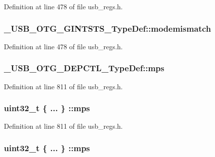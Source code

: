 Definition at line 478 of file usb\-\_\-regs.\-h.

\hypertarget{group___u_s_b___o_t_g___d_r_i_v_e_r_gab4fbf47de9e36e092edfc6ee201616d2}{
\subsubsection[{modemismatch}]{ \-\_\-\-U\-S\-B\-\_\-\-O\-T\-G\-\_\-\-G\-I\-N\-T\-S\-T\-S\-\_\-\-Type\-Def\-::modemismatch}}\label{group___u_s_b___o_t_g___d_r_i_v_e_r_gab4fbf47de9e36e092edfc6ee201616d2}


Definition at line 478 of file usb\-\_\-regs.\-h.

\hypertarget{group___u_s_b___o_t_g___d_r_i_v_e_r_gaee25bec8b0ce21c22dc927bc651c0bcd}{
\subsubsection[{mps}]{ \-\_\-\-U\-S\-B\-\_\-\-O\-T\-G\-\_\-\-D\-E\-P\-C\-T\-L\-\_\-\-Type\-Def\-::mps}}\label{group___u_s_b___o_t_g___d_r_i_v_e_r_gaee25bec8b0ce21c22dc927bc651c0bcd}


Definition at line 811 of file usb\-\_\-regs.\-h.

\hypertarget{group___u_s_b___o_t_g___d_r_i_v_e_r_ga9eb05a703ebf828c524e60777918bfbf}{
\subsubsection[{mps}]{\setlength{\rightskip}{0pt plus 5cm}uint32\-\_\-t \{ ... \} \-::mps}}\label{group___u_s_b___o_t_g___d_r_i_v_e_r_ga9eb05a703ebf828c524e60777918bfbf}


Definition at line 811 of file usb\-\_\-regs.\-h.

\hypertarget{group___u_s_b___o_t_g___d_r_i_v_e_r_gac5c62e548fe92fe0c27d4bc696a5e53d}{
\subsubsection[{mps}]{\setlength{\rightskip}{0pt plus 5cm}uint32\-\_\-t \{ ... \} \-::mps}}\label{group___u_s_b___o_t_g___d_r_i_v_e_r_gac5c62e548fe92fe0c27d4bc696a5e53d}


